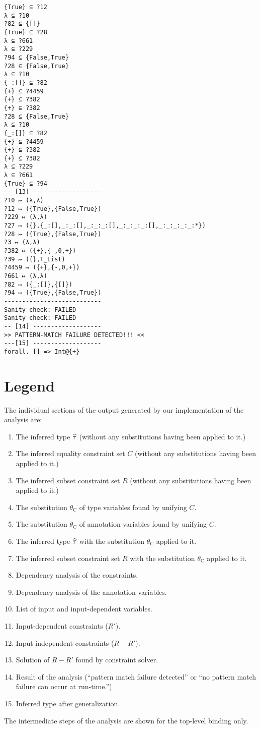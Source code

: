 \begin{Verbatim}
{True} ⊆ ?12
λ ⊆ ?10
?82 ⊆ {[]}
{True} ⊆ ?28
λ ⊆ ?661
λ ⊆ ?229
?94 ⊆ {False,True}
?28 ⊆ {False,True}
λ ⊆ ?10
{_:[]} ⊆ ?82
{+} ⊆ ?4459
{+} ⊆ ?382
{+} ⊆ ?382
?28 ⊆ {False,True}
λ ⊆ ?10
{_:[]} ⊆ ?82
{+} ⊆ ?4459
{+} ⊆ ?382
{+} ⊆ ?382
λ ⊆ ?229
λ ⊆ ?661
{True} ⊆ ?94
-- [13] -------------------
?10 ↦ (λ,λ)
?12 ↦ ({True},{False,True})
?229 ↦ (λ,λ)
?27 ↦ ({},{_:[],_:_:[],_:_:_:[],_:_:_:_:[],_:_:_:_:_:*})
?28 ↦ ({True},{False,True})
?3 ↦ (λ,λ)
?382 ↦ ({+},{-,0,+})
?39 ↦ ({},T_List)
?4459 ↦ ({+},{-,0,+})
?661 ↦ (λ,λ)
?82 ↦ ({_:[]},{[]})
?94 ↦ ({True},{False,True})
---------------------------
Sanity check: FAILED
Sanity check: FAILED
-- [14] -------------------
>> PATTERN-MATCH FAILURE DETECTED!!! <<
---[15] -------------------
forall. [] => Int@{+}
\end{Verbatim}

\section{Legend}
The individual sections of the output generated by our implementation of the analysis are:
\begin{enumerate}
\item The inferred type $\widehat{\tau}$ (without any substitutions having been applied to it.)
\item The inferred equality constraint set $C$ (without any substitutions having been applied to it.)
\item The inferred subset constraint set $R$ (without any substitutions having been applied to it.)
\item The substitution $\theta_\mathrm{C}$ of type variables found by unifying $C$.
\item The substitution $\theta_\mathrm{C}$ of annotation variables found by unifying $C$.
\item The inferred type $\widehat{\tau}$ with the substitution $\theta_\mathrm{C}$ applied to it.
\item The inferred subset constraint set $R$ with the substitution $\theta_\mathrm{C}$ applied to it.
\item Dependency analysis of the constraints.
\item Dependency analysis of the annotation variables.
\item List of input and input-dependent variables.
\item Input-dependent constraints ($R'$).
\item Input-independent constraints ($R - R'$).
\item Solution of $R - R'$ found by constraint solver.
\item Result of the analysis (``pattern match failure detected'' or ``no pattern match failure can occur at run-time.'')
\item Inferred type after generalization.
\end{enumerate}
The intermediate steps of the analysis are shown for the top-level binding only.
